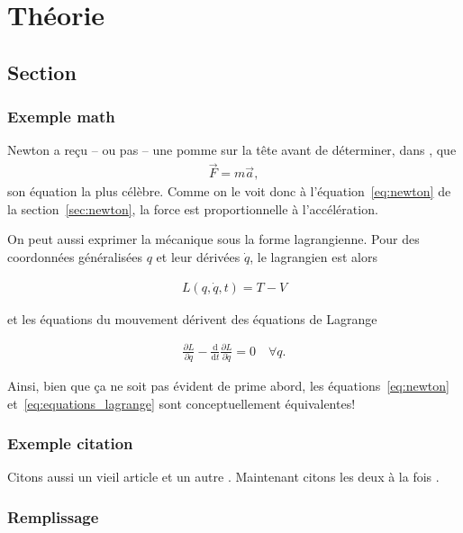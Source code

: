 \begin{comment}
\end{comment}

\chapter{Théorie}


\section{Section}
\subsection{Exemple math \label{sec:newton}}

Newton a reçu -- ou pas -- une pomme sur la tête avant de déterminer, dans \cite{newton1687philosophiae}, que
\begin{align}
    \label{eq:newton}
    \vec F=m \vec a,
\end{align}
son équation la plus célèbre. Comme on le voit donc à l'équation~\eqref{eq:newton} de la section~\ref{sec:newton}, la force est proportionnelle à l'accélération.

On peut aussi exprimer la mécanique sous la forme lagrangienne. Pour des coordonnées généralisées $q$ et leur dérivées $\dot q$, le lagrangien est alors

\begin{align}
    \label{eq:lagrangien}
    L(q, \dot q, t) = T - V
\end{align}

et les équations du mouvement dérivent des équations de Lagrange 

\begin{align}
    \label{eq:equations_lagrange}
    \frac{\partial L}{\partial q} - \frac{\mathrm{d}}{\mathrm{d}t}\frac{\partial L}{\partial \dot q} = 0 \quad \forall q
    .   %
\end{align}

Ainsi, bien que ça ne soit pas évident de prime abord, les équations~\eqref{eq:newton} et~\eqref{eq:equations_lagrange} sont conceptuellement équivalentes!

\subsection{Exemple citation}
Citons aussi un vieil article \cite{andreev1964} et un autre \cite{robertson1929}. Maintenant citons les deux à la fois \cite{andreev1964, robertson1929}.

\subsection{Remplissage}
\kant[8-10]

